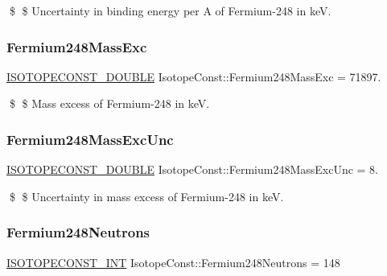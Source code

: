 \$ \$ Uncertainty in binding energy per A of Fermium-\/248 in keV. \mbox{\label{group___isotope_const-_fermium-_fm248_ga3bbf0150469968d33bab16c7f98a2097}} 
\subsubsection{\texorpdfstring{Fermium248\+Mass\+Exc}{Fermium248MassExc}}
{\footnotesize\ttfamily \mbox{\hyperlink{group___isotope_const-_macros_ga8f45a7272ce02c0b4c65c44636ed719a}{I\+S\+O\+T\+O\+P\+E\+C\+O\+N\+S\+T\+\_\+\+D\+O\+U\+B\+LE}} Isotope\+Const\+::\+Fermium248\+Mass\+Exc = 71897.}

\$ \$ Mass excess of Fermium-\/248 in keV. \mbox{\label{group___isotope_const-_fermium-_fm248_gaf04d408532d6f68ee5e2bb908c64c1cd}} 
\subsubsection{\texorpdfstring{Fermium248\+Mass\+Exc\+Unc}{Fermium248MassExcUnc}}
{\footnotesize\ttfamily \mbox{\hyperlink{group___isotope_const-_macros_ga8f45a7272ce02c0b4c65c44636ed719a}{I\+S\+O\+T\+O\+P\+E\+C\+O\+N\+S\+T\+\_\+\+D\+O\+U\+B\+LE}} Isotope\+Const\+::\+Fermium248\+Mass\+Exc\+Unc = 8.}

\$ \$ Uncertainty in mass excess of Fermium-\/248 in keV. \mbox{\label{group___isotope_const-_fermium-_fm248_gac1765a34c15c1f0761b115ed322767ae}} 
\subsubsection{\texorpdfstring{Fermium248\+Neutrons}{Fermium248Neutrons}}
{\footnotesize\ttfamily \mbox{\hyperlink{group___isotope_const-_macros_ga5f18360b3e99483a35c32d789e62621c}{I\+S\+O\+T\+O\+P\+E\+C\+O\+N\+S\+T\+\_\+\+I\+NT}} Isotope\+Const\+::\+Fermium248\+Neutrons = 148}

